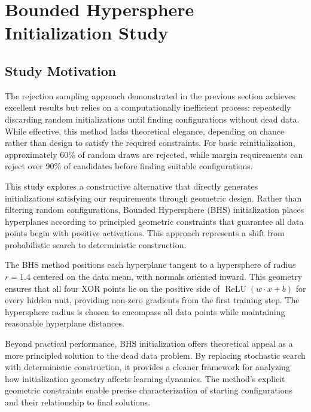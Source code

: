 \section{Bounded Hypersphere Initialization Study}
\label{sec:relu1-bounded-hypersphere}


\subsection*{Study Motivation}

The rejection sampling approach demonstrated in the previous section achieves excellent results but relies on a computationally inefficient process: repeatedly discarding random initializations until finding configurations without dead data. While effective, this method lacks theoretical elegance, depending on chance rather than design to satisfy the required constraints. For basic reinitialization, approximately 60\% of random draws are rejected, while margin requirements can reject over 90\% of candidates before finding suitable configurations.

This study explores a constructive alternative that directly generates initializations satisfying our requirements through geometric design. Rather than filtering random configurations, Bounded Hypersphere (BHS) initialization places hyperplanes according to principled geometric constraints that guarantee all data points begin with positive activations. This approach represents a shift from probabilistic search to deterministic construction.

The BHS method positions each hyperplane tangent to a hypersphere of radius $r=1.4$ centered on the data mean, with normals oriented inward. This geometry ensures that all four XOR points lie on the positive side of $\operatorname{ReLU}(w \cdot x + b)$ for every hidden unit, providing non-zero gradients from the first training step. The hypersphere radius is chosen to encompass all data points while maintaining reasonable hyperplane distances.

Beyond practical performance, BHS initialization offers theoretical appeal as a more principled solution to the dead data problem. By replacing stochastic search with deterministic construction, it provides a cleaner framework for analyzing how initialization geometry affects learning dynamics. The method's explicit geometric constraints enable precise characterization of starting configurations and their relationship to final solutions.

